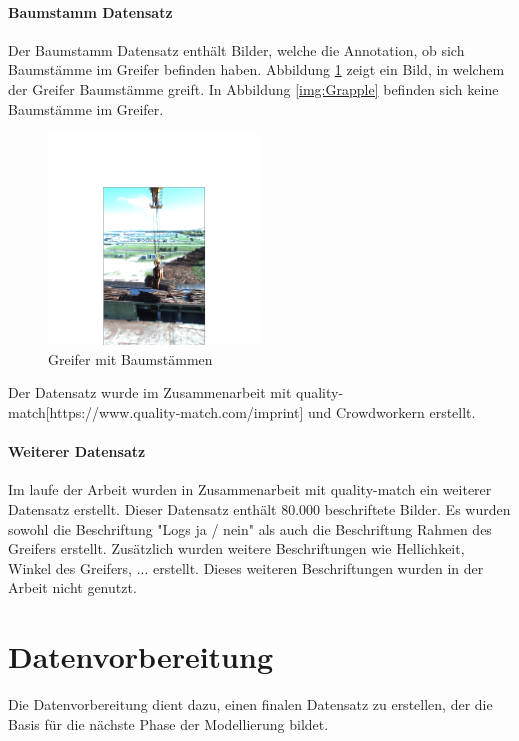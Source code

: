 		\paragraph{Baumstamm Datensatz} Der Baumstamm Datensatz enthält Bilder, welche die Annotation, ob sich Baumstämme im Greifer befinden haben. Abbildung \ref{img:Logs} zeigt ein Bild, in welchem der Greifer Baumstämme greift. In Abbildung \ref{img:Grapple} befinden sich keine Baumstämme im Greifer.
		\begin{figure}[h]
			\centering
			\includegraphics[width=0.5\textwidth, center]{bilder/Grundlagen/Logs_14.png}
			\caption[Bsp. Bild: Greifer mit Baumstämmen]{Greifer mit Baumstämmen}
			\label{img:Logs}
		\end{figure}
		Der Datensatz wurde im Zusammenarbeit mit quality-match[https://www.quality-match.com/imprint] und Crowdworkern erstellt.  

		\paragraph{Weiterer Datensatz}
		Im laufe der Arbeit wurden in Zusammenarbeit mit quality-match ein weiterer Datensatz erstellt. Dieser Datensatz enthält  80.000 beschriftete Bilder. Es wurden sowohl die Beschriftung "Logs ja / nein" als auch die Beschriftung  Rahmen des Greifers erstellt. Zusätzlich wurden weitere Beschriftungen wie Hellichkeit, Winkel des Greifers, ... erstellt. Dieses weiteren Beschriftungen wurden in der Arbeit nicht genutzt.		
	
		
	\section{Datenvorbereitung}
	\label{sec:DataPreparation}

Die Datenvorbereitung dient dazu, einen finalen Datensatz zu erstellen, der die Basis für die nächste Phase der Modellierung bildet.



